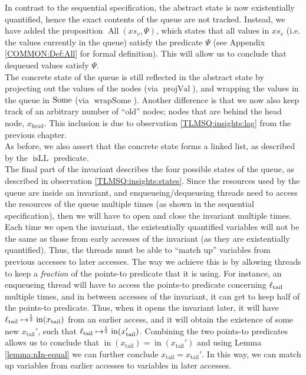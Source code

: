 \documentclass[a4paper, 10pt]{report}
\theoremstyle{definition}
\newcommand{\isLL}{\operatorname{isLL}}
\newcommand{\AllP}{\operatorname{All}}
\newcommand{\projval}{\operatorname{projVal}}
\newcommand{\wrapsome}{\operatorname{wrapSome}}
\newcommand{\locN}[1]{\loc_{\mathrm{#1}}}
\newcommand{\loctail}{\locN{tail}}
\newcommand{\nIn}[1]{\operatorname{in}(#1)}
\newcommand{\node}{x}
\newcommand{\nodeN}[1]{\node_{\mathrm{#1}}}
\newcommand{\nodehead}{\nodeN{head}}
\newcommand{\nodetail}{\nodeN{tail}}
\newcommand{\absvalueList}{xs_v}
\begin{document}
In contrast to the sequential specification, the abstract state is now existentially quantified, hence the exact contents of the queue are not tracked. Instead, we have added the proposition $\AllP(\absvalueList, \Psi)$, which states that all values in $\absvalueList$ (i.e. the values currently in the queue) satisfy the predicate $\Psi$ (see Appendix \ref{COMMON:Def:All} for formal definition). This will allow us to conclude that dequeued values satisfy $\Psi$.\\
The concrete state of the queue is still reflected in the abstract state by projecting out the values of the nodes (via $\projval$), and wrapping the values in the queue in $\operatorname{Some}$ (via $\wrapsome$). Another difference is that we now also keep track of an arbitrary number of ``old'' nodes; nodes that are behind the head node, $\nodehead$. This inclusion is due to observation \ref{TLMSQ:insights:lag} from the previous chapter.\\
As before, we also assert that the concrete state forms a linked list, as described by the $\isLL$ predicate.\\
The final part of the invariant describes the four possible states of the queue, as described in observation \ref{TLMSQ:insights:states}. Since the resources used by the queue are inside an invariant, and enqueueing/dequeueing threads need to access the resources of the queue multiple times (as shown in the sequential specification), then we will have to open and close the invariant multiple times. Each time we open the invariant, the existentially quantified variables will not be the same as those from early accesses of the invariant (as they are existentially quantified). Thus, the threads must be able to ``match up'' variables from previous accesses to later accesses. The way we achieve this is by allowing threads to keep a \textit{fraction} of the points-to predicate that it is using. For instance, an enqueueing thread will have to access the points-to predicate concerning $\loctail$ multiple times, and in between accesses of the invariant, it can get to keep half of the points-to predicate. Thus, when it opens the invariant later, it will have $\loctail \mapsto^{\frac{1}{2}} \nIn{\nodetail}$ from an earlier access, and it will obtain the existence of some new $\nodetail'$, such that $\loctail \mapsto^{\frac{1}{2}} \nIn{\nodetail'}$. Combining the two points-to predicates allows us to conclude that $\nIn{\nodetail} = \nIn{\nodetail'}$ and using Lemma \ref{lemma:nIn-equal} we can further conclude $\nodetail = \nodetail'$. In this way, we can match up variables from earlier accesses to variables in later accesses.\\
\end{document}
